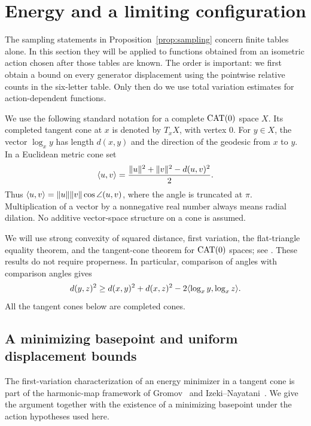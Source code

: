 \section{Energy and a limiting configuration}\label{sec:energy}

The sampling statements in Proposition~\ref{prop:sampling} concern finite
tables alone.  In this section they will be applied to functions obtained
from an isometric action chosen after those tables are known.  The order
is important: we first obtain a bound on every generator displacement
using the pointwise relative counts in the six-letter table.  Only then
do we use total variation estimates for action-dependent functions.

We use the following standard notation for a complete $\operatorname{CAT}(0)$ space
$X$.  Its completed tangent cone at $x$ is denoted by $T_xX$, with vertex
$0$.  For $y\in X$, the vector $\log_x y$ has length $d(x,y)$ and the
direction of the geodesic from $x$ to $y$.  In a Euclidean metric cone set
\[
 \langle u,v\rangle=\frac{\lVert u\rVert^2+\lVert v\rVert^2-d(u,v)^2}{2}.
\]
Thus $\langle u,v\rangle=\lVert u\rVert\lVert v\rVert\cos\angle(u,v)$, where the angle is
truncated at $\pi$.  Multiplication of a vector by a nonnegative real
number always means radial dilation.  No additive vector-space structure
on a cone is assumed.

We will use strong convexity of squared distance, first variation, the
flat-triangle equality theorem, and the tangent-cone theorem for
$\operatorname{CAT}(0)$ spaces; see \cite[Chapters~II.1--II.3, in particular
II.2.9--II.2.10, II.3.6, and II.3.19]{BH1999}.  These results do not require
properness.  In particular, comparison of angles with comparison angles
gives
\begin{equation}\label{energy:log-comparison}
 d(y,z)^2\ge
 d(x,y)^2+d(x,z)^2
 -2\langle \log_x y,\log_x z\rangle.
\end{equation}
All the tangent cones below are completed cones.

\subsection{A minimizing basepoint and uniform displacement bounds}

The first-variation characterization of an energy minimizer in a
tangent cone is part of the harmonic-map framework of
Gromov~\cite[Sections~3.3 and~3.7]{Gromov2003} and
Izeki--Nayatani~\cite{IzekiNayatani2005}.
We give the argument together with the existence of a minimizing
basepoint under the action hypotheses used here.


